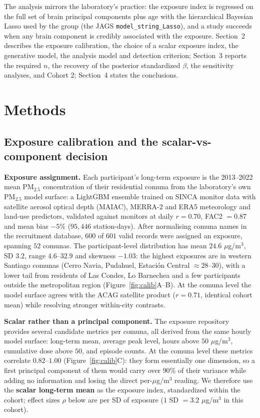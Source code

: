 \documentclass[11pt,a4paper]{article}
\newcommand{\pmf}{PM$_{2.5}$}
\newcommand{\ugm}{$\mu$g/m$^{3}$}
\begin{document}
The analysis mirrors the laboratory's practice: the exposure index is regressed on the full set of brain principal components plus age with the hierarchical Bayesian Lasso used by the group (the JAGS \texttt{model\_string\_Lasso}), and a study succeeds when any brain component is credibly associated with the exposure. Section~2 describes the exposure calibration, the choice of a scalar exposure index, the generative model, the analysis model and detection criterion; Section~3 reports the required $n$, the recovery of the posterior standardized $\beta$, the sensitivity analyses, and Cohort 2; Section~4 states the conclusions.

\section{Methods}

\subsection{Exposure calibration and the scalar-vs-component decision}

\textbf{Exposure assignment.} Each participant's long-term exposure is the 2013--2022 mean \pmf{} concentration of their residential comuna from the laboratory's own \pmf{} model surface: a LightGBM ensemble trained on SINCA monitor data with satellite aerosol optical depth (MAIAC), MERRA-2 and ERA5 meteorology and land-use predictors, validated against monitors at daily $r=0.70$, FAC2 $=0.87$ and mean bias $-5\%$ ($95{,}446$ station-days). After normalising comuna names in the recruitment database, $600$ of $601$ valid records were assigned an exposure, spanning $52$ comunas. The participant-level distribution has mean $24.6$ \ugm{}, SD $3.2$, range $4.6$--$32.9$ and skewness $-1.03$: the highest exposures are in western Santiago comunas (Cerro Navia, Pudahuel, Estación Central $\approx28$--$30$), with a lower tail from residents of Las Condes, Lo Barnechea and a few participants outside the metropolitan region (Figure~\ref{fig:calib}A--B). At the comuna level the model surface agrees with the ACAG satellite product \cite{vandonkelaar} ($r=0.71$, identical cohort mean) while resolving stronger within-city contrasts.

\textbf{Scalar rather than a principal component.} The exposure repository provides several candidate metrics per comuna, all derived from the same hourly model surface: long-term mean, average peak level, hours above $50$ \ugm{}, cumulative dose above $50$, and episode counts. At the comuna level these metrics correlate $0.82$--$1.00$ (Figure~\ref{fig:calib}C): they form essentially one dimension, so a first principal component of them would carry over $90\%$ of their variance while adding no information and losing the direct per-\ugm{} reading. We therefore use the \textbf{scalar long-term mean} as the exposure index, standardized within the cohort; effect sizes $\rho$ below are per SD of exposure ($1$ SD $=3.2$ \ugm{} in this cohort).
\end{document}
